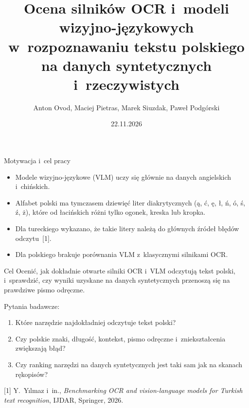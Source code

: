 \documentclass[aspectratio=169,11pt]{beamer}
\title{Ocena silników OCR i~modeli wizyjno-językowych w~rozpoznawaniu tekstu polskiego na danych syntetycznych
  i~rzeczywistych}
\author{Anton Ovod, Maciej Pietras, Marek Siuzdak, Paweł Podgórski}
\institute{Politechnika Lubelska, Wydział Elektrotechniki i~Informatyki}
\date{22.11.2026}
\newcommand{\zrodlo}[1]{\par\vfill{\tiny\color{black!65}#1\par}}
\begin{document}
\begin{frame}[plain]
  \titlepage
\end{frame}

\begin{frame}{Motywacja i~cel pracy}
  \small
  \begin{itemize}
    \item Modele wizyjno-językowe (VLM) uczy się głównie na danych angielskich i~chińskich.
    \item Alfabet polski ma tymczasem dziewięć liter diakrytycznych ({\color{akcent}ą, ć, ę, ł, ń, ó, ś, ź, ż}),
      które od łacińskich różni tylko ogonek, kreska lub kropka.
    \item Dla tureckiego wykazano, że takie litery należą do głównych źródeł błędów odczytu~[1].
    \item Dla polskiego brakuje porównania VLM z~klasycznymi silnikami OCR.
  \end{itemize}
  \begin{block}{Cel}
    Ocenić, jak dokładnie otwarte silniki OCR i~VLM odczytują tekst polski, i~sprawdzić, czy wyniki uzyskane
    na danych syntetycznych przenoszą się na prawdziwe pismo odręczne.
  \end{block}
  \vspace{-2pt}Pytania badawcze:
  \begin{enumerate}
    \setlength{\itemsep}{0pt}
    \item Które narzędzie najdokładniej odczytuje tekst polski?
    \item Czy polskie znaki, długość, kontekst, pismo odręczne i~zniekształcenia zwiększają błąd?
    \item Czy ranking narzędzi na danych syntetycznych jest taki sam jak na skanach rękopisów?
  \end{enumerate}
  \vspace{10pt}
  \zrodlo{[1] Y.~Yılmaz i~in., \emph{Benchmarking OCR and vision-language models for Turkish text recognition},
  IJDAR, Springer, 2026.}
\end{frame}
\end{document}
